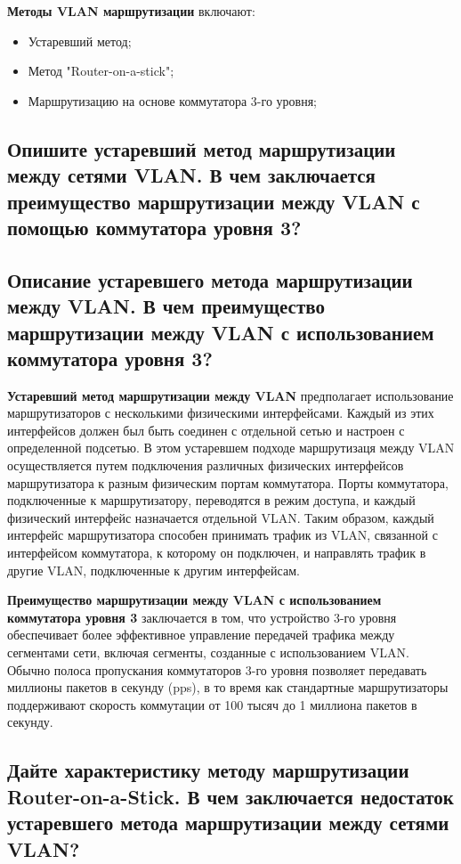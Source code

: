 \textbf{Методы VLAN маршрутизации} включают:

\begin{itemize}
	\item Устаревший метод;
	\item Метод "Router-on-a-stick";
	\item Маршрутизацию на основе коммутатора 3-го уровня;
\end{itemize}

\subsection{Опишите устаревший метод маршрутизации между сетями VLAN. В 
чем заключается преимущество маршрутизации между VLAN с 
помощью коммутатора уровня 3?}

\subsection{Описание устаревшего метода маршрутизации между VLAN. В чем преимущество маршрутизации между VLAN с использованием коммутатора уровня 3?}

\textbf{Устаревший метод маршрутизации между VLAN} предполагает использование
маршрутизаторов с несколькими физическими интерфейсами.
Каждый из этих интерфейсов должен был быть соединен с отдельной сетью
и настроен с определенной подсетью.
В этом устаревшем подходе маршрутизаця между VLAN осуществляется путем
подключения различных физических интерфейсов маршрутизатора
к разным физическим портам коммутатора.
Порты коммутатора, подключенные к маршрутизатору, переводятся в режим доступа,
и каждый физический интерфейс назначается отдельной VLAN.
Таким образом, каждый интерфейс маршрутизатора способен принимать трафик
из VLAN, связанной с интерфейсом коммутатора, к которому он подключен,
и направлять трафик в другие VLAN, подключенные к другим интерфейсам.\par
\textbf{Преимущество маршрутизации между VLAN с использованием коммутатора
уровня 3} заключается в том, что устройство 3-го уровня обеспечивает
более эффективное управление передачей трафика между сегментами сети,
включая сегменты, созданные с использованием VLAN. Обычно полоса пропускания
коммутаторов 3-го уровня позволяет передавать миллионы пакетов
в секунду (pps), в то время как стандартные маршрутизаторы поддерживают
скорость коммутации от 100 тысяч до 1 миллиона пакетов в секунду.

\subsection{Дайте характеристику методу маршрутизации Router-on-a-Stick. В 
	чем заключается недостаток устаревшего метода маршрутизации 
	между сетями VLAN?}

